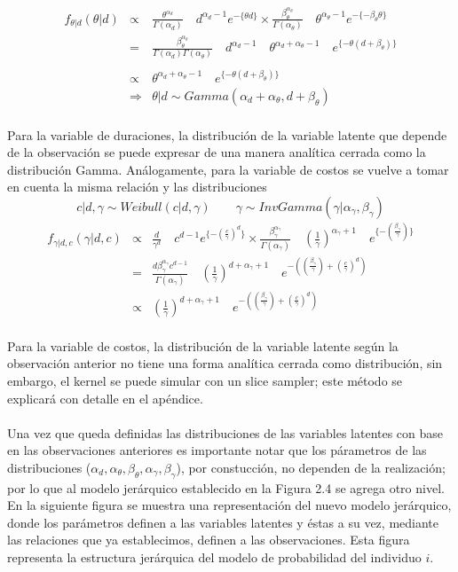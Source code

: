 \begin{eqnarray*}
f_{\theta|d}(\theta|d) &\propto& \frac{\theta^{\alpha_d}}{\Gamma(\alpha_d)}\quad d^{\alpha_d-1} e^{-\{\theta d\}} \times \frac{\beta_\theta^{\alpha_\theta}}{\Gamma(\alpha_\theta)}\quad \theta^{\alpha_\theta-1} e^{-\{-\beta_\theta \theta\}}\\
&=&\frac{\beta_\theta^{\alpha_\theta}}{\Gamma(\alpha_d)\Gamma(\alpha_\theta)} \quad d^{\alpha_d-1} \quad\theta^{\alpha_d+\alpha_\theta-1} \quad e^{\{-\theta(d+\beta_\theta)\}}\\
\\
&\propto& \theta^{\alpha_d+\alpha_\theta-1} \quad e^{\{-\theta(d+\beta_\theta)\}}\\
&\Rightarrow& \theta|d \sim Gamma(\alpha_d+\alpha_\theta,d+\beta_\theta)
\end{eqnarray*}
\\
Para la variable de duraciones, la distribuci\'on de la variable latente que depende de la observaci\'on se puede expresar de una manera anal\'itica cerrada como la distribuci\'on Gamma. An\'alogamente, para la variable de costos se vuelve a tomar en cuenta la misma relaci\'on y las distribuciones 
\[c|d,\gamma \sim Weibull(c|d,\gamma) \qquad \gamma \sim InvGamma(\gamma|\alpha_\gamma,\beta_\gamma)\]
\begin{eqnarray*}
f_{\gamma|d,c}(\gamma|d,c) &\propto& \frac{d}{\gamma^d}\quad c^{d-1} e^{\{-(\frac{c}{\gamma})^d\}} \times \frac{\beta_\gamma^{\alpha_\gamma}}{\Gamma(\alpha_\gamma)}\quad (\frac{1}{\gamma})^{\alpha_\gamma+1} \quad e^{\{-(\frac{\beta_\gamma}{\gamma})\}}\\
&=&\frac{d\beta_\gamma^{\alpha_\gamma} c^{d-1}}{\Gamma(\alpha_\gamma)}\quad (\frac{1}{\gamma})^{d+\alpha_\gamma+1}\quad e^{-((\frac{\beta_\gamma}{\gamma})+(\frac{c}{\gamma})^d)}\\
&\propto&(\frac{1}{\gamma})^{d+\alpha_\gamma+1}\quad e^{-((\frac{\beta_\gamma}{\gamma})+(\frac{c}{\gamma})^d)}
\end{eqnarray*}
\\
Para la variable de costos, la distribuci\'on de la variable latente seg\'un la observaci\'on anterior no tiene una forma anal\'itica cerrada como distribuci\'on, sin embargo, el kernel se puede simular con un slice sampler; este m\'etodo se explicar\'a con detalle en el ap\'endice. \\
\\
Una vez que queda definidas las distribuciones de las variables latentes con base en las observaciones anteriores es importante notar que los p\'arametros de las distribuciones ($\alpha_d, \alpha_\theta, \beta_\theta, \alpha_\gamma, \beta_\gamma$), por constucci\'on, no dependen de la realizaci\'on; por lo que al modelo jer\'arquico establecido en la Figura 2.4 se agrega otro nivel. En la siguiente figura se muestra una representaci\'on del nuevo modelo jer\'arquico, donde los par\'ametros definen a las variables latentes y \'estas a su vez, mediante las relaciones que ya establecimos, definen a las observaciones. Esta figura representa la estructura jer\'arquica del modelo de probabilidad del individuo $i$.\\

